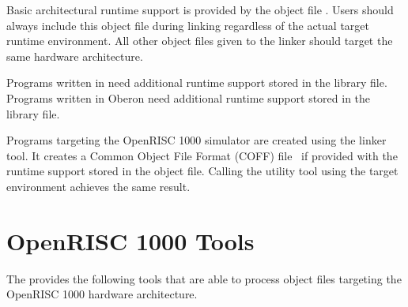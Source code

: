 Basic architectural runtime support is provided by the object file .
Users should always include this object file during linking regardless of the actual target runtime environment.
All other object files given to the linker should target the same hardware architecture.

Programs written in \cpp{} need additional runtime support stored in the  library file.
Programs written in Oberon need additional runtime support stored in the  library file.
\seecpp\seeoberon

Programs targeting the OpenRISC 1000 simulator are created using the  linker tool.
It creates a Common Object File Format (COFF) file~\cite{cofffile} if provided with the runtime support stored in the  object file.
Calling the  utility tool using the  target environment achieves the same result.

\section{OpenRISC 1000 Tools}

The \ecs{} provides the following tools that are able to process object files targeting the OpenRISC 1000 hardware architecture.
\interface

\cdorok
\cpporok
\falorok
\oborok
\orokasm
\orokdism
\linkbin

\concludechapter
